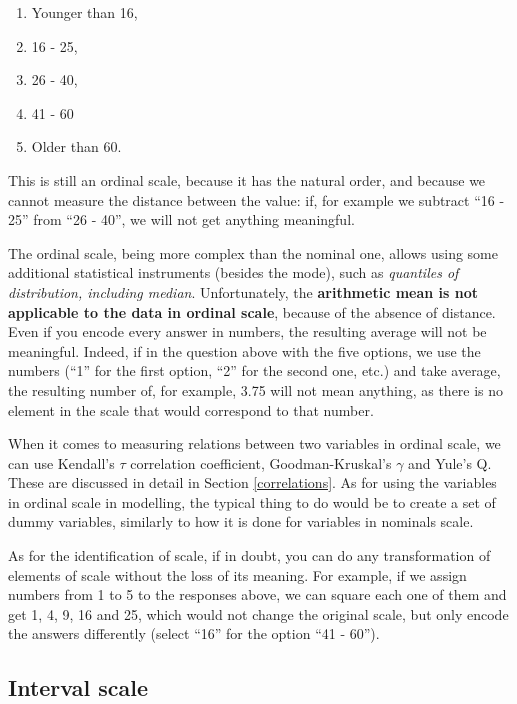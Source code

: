 \documentclass[
]{book}
\providecommand{\tightlist}{%
  \setlength{\itemsep}{0pt}\setlength{\parskip}{0pt}}
\theoremstyle{definition}
\theoremstyle{definition}
\theoremstyle{definition}
\theoremstyle{definition}
\theoremstyle{remark}
\begin{document}
\begin{enumerate}
\def\labelenumi{\arabic{enumi}.}
\tightlist
\item
  Younger than 16,
\item
  16 - 25,
\item
  26 - 40,
\item
  41 - 60
\item
  Older than 60.
\end{enumerate}

This is still an ordinal scale, because it has the natural order, and because we cannot measure the distance between the value: if, for example we subtract ``16 - 25'' from ``26 - 40'', we will not get anything meaningful.

The ordinal scale, being more complex than the nominal one, allows using some additional statistical instruments (besides the mode), such as \emph{quantiles of distribution, including median}. Unfortunately, the \textbf{arithmetic mean is not applicable to the data in ordinal scale}, because of the absence of distance. Even if you encode every answer in numbers, the resulting average will not be meaningful. Indeed, if in the question above with the five options, we use the numbers (``1'' for the first option, ``2'' for the second one, etc.) and take average, the resulting number of, for example, 3.75 will not mean anything, as there is no element in the scale that would correspond to that number.

When it comes to measuring relations between two variables in ordinal scale, we can use Kendall's \(\tau\) correlation coefficient, Goodman-Kruskal's \(\gamma\) and Yule's Q. These are discussed in detail in Section \ref{correlations}. As for using the variables in ordinal scale in modelling, the typical thing to do would be to create a set of dummy variables, similarly to how it is done for variables in nominals scale.

As for the identification of scale, if in doubt, you can do any transformation of elements of scale without the loss of its meaning. For example, if we assign numbers from 1 to 5 to the responses above, we can square each one of them and get 1, 4, 9, 16 and 25, which would not change the original scale, but only encode the answers differently (select ``16'' for the option ``41 - 60'').

\hypertarget{interval-scale}{%
\subsection{Interval scale}\label{interval-scale}}
\end{document}
